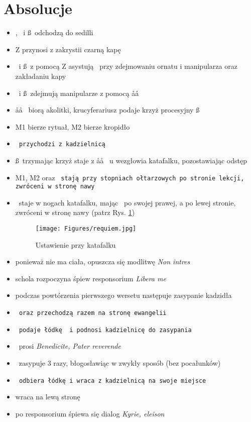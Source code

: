 \section{Absolucje}

\begin{itemize}
	\item \ii, \dd~i \ss~odchodzą do sedilli
	\item Z przynosi z zakrystii czarną kapę
	\item \dd~i \ss~z pomocą Z asystują \ii~przy zdejmowaniu ornatu i manipularza
		oraz zakładaniu kapy
	\item \dd~i \ss~zdejmują manipularze z pomocą \aa\aa~
	\item \aa\aa~ biorą akolitki, krucyferariusz podaje krzyż procesyjny \ss
	\item M1 bierze rytuał, M2 bierze kropidło
	\item \tt~przychodzi z kadzielnicą
	\item \ss~trzymając krzyż staje z \aa\aa~ u wezgłowia katafalku, pozostawiając
		odstęp
	\item M1, M2 oraz \tt~stają przy stopniach ołtarzowych po stronie lekcji,
		zwróceni w stronę nawy
	\item \ii~staje w nogach katafalku, mając \dd~po swojej prawej, a  po
		lewej stronie, zwróceni w stronę nawy (patrz Rys.
		\ref{fig:requiem})
		\begin{figure}[h]
			\centering
			\texttt{[image: Figures/requiem.jpg]}
			\caption{Ustawienie przy katafalku}
			\label{fig:requiem}
		\end{figure}
	\item ponieważ nie ma ciała, opuszcza się modlitwę \textit{Non intres}
	\item schola rozpoczyna śpiew responsorium \textit{Libera me}
	\item podczas powtórzenia pierwszego wersetu następuje zasypanie
		kadzidła
	\item \tt~oraz  przechodzą razem na stronę ewangelii
	\item \tt~podaje łódkę \dd~i podnosi kadzielnicę do zasypania
	\item \dd~prosi \textit{Benedicite, Pater reverende}
	\item \ii~zasypuje 3 razy, błogosławiąc w zwykły sposób (bez pocałunków)
	\item \tt~odbiera łódkę i wraca z kadzielnicą na swoje miejsce
	\item {} wraca na lewą stronę \ii
	\item po responsorium śpiewa się dialog \textit{Kyrie, eleison}

\end{itemize}
